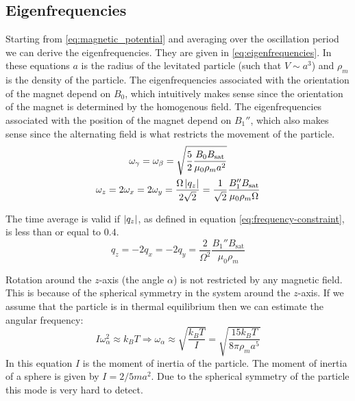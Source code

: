 \subsection{Eigenfrequencies}
\label{subsec:eigenfrequencies}
Starting from \autoref{eq:magnetic_potential} and averaging over the oscillation period we can derive the eigenfrequencies. They are given in \autoref{eq:eigenfrequencies}. In these equations $a$ is the radius of the levitated particle (such that $V \sim a^3$) and $\rho_m$ is the density of the particle. The eigenfrequencies associated with the orientation of the magnet depend on $B_0$, which intuitively makes sense since the orientation of the magnet is determined by the homogenous field. The eigenfrequencies associated with the position of the magnet depend on $B_1''$, which also makes sense since the alternating field is what restricts the movement of the particle.
\begin{equation}
    \begin{gathered}
        \omega_\gamma = \omega_{\beta} = \sqrt{\frac{5}{2}\frac{B_0B_\text{sat}}{\mu_0 \rho_m a^2}} \\
        \omega_z = 2\omega_x = 2\omega_y = \frac{\Omega \left\lvert q_z\right\rvert}{2\sqrt{2}} = \frac{1}{\sqrt{2}}\frac{B_1''B_\text{sat}}{\mu_0\rho_m\Omega}
    \end{gathered}
    \label{eq:eigenfrequencies}
\end{equation}

The time average is valid if $\left\lvert q_z\right\rvert$, as defined in equation \ref{eq:frequency-constraint}, is less than or equal to $0.4$.
\begin{equation}
    q_z = -2q_x = -2q_y = \frac{2}{\Omega^2}\frac{B_1''B_{\text{sat}}}{\mu_0\rho_m}
    \label{eq:frequency-constraint}
\end{equation}

Rotation around the $z$-axis (the angle $\alpha$) is not restricted by any magnetic field. This is because of the spherical symmetry in the system around the $z$-axis. If we assume that the particle is in thermal equilibrium then we can estimate the angular frequency:
\begin{equation}
    I\omega_\alpha^2 \approx k_B T \Rightarrow \omega_\alpha \approx \sqrt{\frac{k_B T}{I}} = \sqrt{\frac{15 k_B T}{8 \pi \rho_m a^5}}
\end{equation}
In this equation $I$ is the moment of inertia of the particle. The moment of inertia of a sphere is given by $I = 2/5 m a^2$. Due to the spherical symmetry of the particle this mode is very hard to detect.
